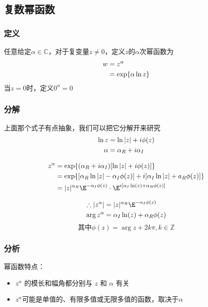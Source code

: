 
\begin{issues}
\issueDraft
\issueTODO
\end{issues}



\subsection{复数幂函数}

\subsubsection{定义}
任意给定$\alpha\in \mathbb{C}$，对于复变量$z\ne 0$，定义$z$的$\alpha$次幂函数为
\begin{align}
w&=z^\alpha\notag\\
&=\exp\{\alpha \ln z\}
\end{align}
当$z=0$时，定义$0^\alpha = 0$
\subsubsection{分解}
上面那个式子有点抽象，我们可以把它分解开来研究
\begin{align}
\ln z &= \ln |z|+i\phi(z)\notag\\
\alpha&=\alpha_R+i\alpha_I\notag\\
\end{align}

\begin{align}
z^\alpha&=\exp\{(\alpha_R+i\alpha_I)[\ln |z|+i\phi(z)]\notag\}\\
&=\exp\{[\alpha_R \ln|z|-\alpha_I\phi (z)]+i[\alpha_I\ln|z|+a_R\phi(z)]\}\notag\\
&=|z|^{\alpha_R}\E^{-\alpha_I\phi(z)}\cdot \E^{i[\alpha_I\ln(z)+\alpha_R\phi(z)]}
\end{align}

\begin{align}
\therefore |z^\alpha|&=|z|^{\alpha_R}\E^{-\alpha_I\phi(z)}\notag\\
\arg z^\alpha&=\alpha_I\ln(z)+\alpha_R\phi(z)\notag
\end{align}
\[\text{其中}\phi(z)=\arg z+2k\pi,k\in\mathbb Z\]
\subsubsection{分析}
幂函数特点：\\
\begin{itemize}
\item $z^\alpha$ 的模长和幅角都分别与 $z$ 和 $\alpha$ 有关\\
\item $z^\alpha$可能是单值的、有限多值或无限多值的函数，取决于$\alpha$
\end{itemize}

